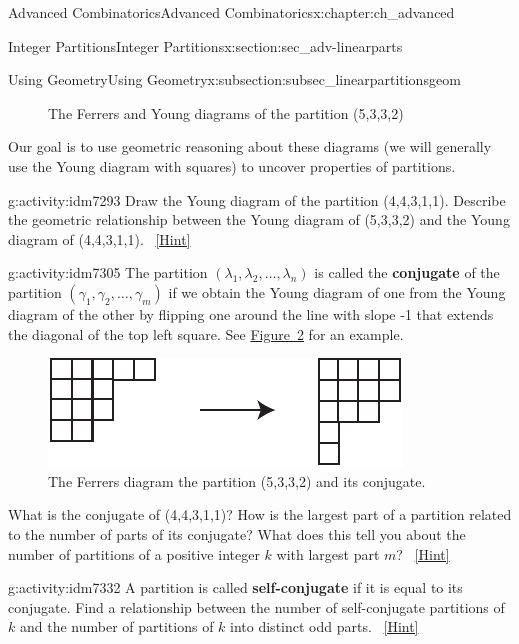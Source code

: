 \documentclass[oneside,10pt,]{book}
\newcommand{\terminology}[1]{\textbf{#1}}
\numberwithin{equation}{chapter}
\begin{document}
\begin{chapterptx}{Advanced Combinatorics}{}{Advanced Combinatorics}{}{}{x:chapter:ch_advanced}
\begin{sectionptx}{Integer Partitions}{}{Integer Partitions}{}{}{x:section:sec_adv-linearparts}
\begin{subsectionptx}{Using Geometry}{}{Using Geometry}{}{}{x:subsection:subsec_linearpartitionsgeom}
\begin{introduction}{}
\begin{figure}
\caption{The Ferrers and Young diagrams of the partition (5,3,3,2)\label{x:figure:FerrersYoung-repeat}}
\end{figure}
Our goal is to use geometric reasoning about these diagrams (we will generally use the Young diagram with squares) to uncover properties of partitions.%
\begin{activity}{}{g:activity:idm7293}%
Draw the Young diagram of the partition (4,4,3,1,1). Describe the geometric relationship between the Young diagram of (5,3,3,2) and the Young diagram of (4,4,3,1,1).%
\qquad~\hfill{\tiny\hyperlink{g:hint:idm7296-back}{[Hint]}}\end{activity}
\begin{activity}{}{g:activity:idm7305}%
The partition \((\lambda_1,\lambda_2,\ldots, \lambda_n)\) is called the \terminology{conjugate} of the partition \((\gamma_1,\gamma_2,\ldots, \gamma_m)\) if we obtain the Young diagram of one from the Young diagram of the other by flipping one around the line with slope -1 that extends the diagonal of the top left square. See \hyperref[x:figure:conjugateYoung]{Figure~\ref{x:figure:conjugateYoung}} for an example.%
\begin{figure}
\centering
\includegraphics[width=0.5\linewidth]{images/conjugateYoung}
\caption{The Ferrers diagram the partition (5,3,3,2) and its conjugate.\label{x:figure:conjugateYoung}}
\end{figure}
What is the conjugate of (4,4,3,1,1)? How is the largest part of a partition related to the number of parts of its conjugate? What does this tell you about the number of partitions of a positive integer \(k\) with largest part \(m\)?%
\qquad~\hfill{\tiny\hyperlink{g:hint:idm7323-back}{[Hint]}}\end{activity}
\begin{activity}{}{g:activity:idm7332}%
A partition is called \terminology{self-conjugate} if it is equal to its conjugate. Find a relationship between the number of self-conjugate partitions of \(k\) and the number of partitions of \(k\) into distinct odd parts.%
\qquad~\hfill{\tiny\hyperlink{g:hint:idm7343-back}{[Hint]}}\end{activity}

\end{introduction}
\end{subsectionptx}
\end{sectionptx}
\end{chapterptx}
\end{document}
